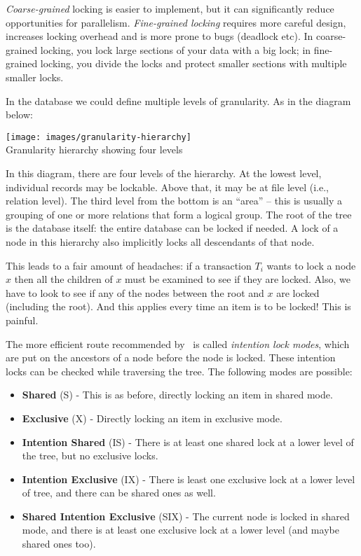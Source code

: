 \documentclass[a4paper]{report}
\begin{document}
\textit{Coarse-grained} locking is easier to implement, but it can significantly reduce opportunities for parallelism. \textit{Fine-grained locking} requires more careful design, increases locking overhead and is more prone to bugs (deadlock etc).  
In coarse-grained locking, you lock large sections of your data with a big lock; in fine-grained locking, you divide the locks and protect smaller sections with multiple smaller locks.

In the database we could define multiple levels of granularity. As in the diagram below:

\begin{center}
\texttt{[image: images/granularity-hierarchy]}\\
Granularity hierarchy showing four levels~\cite{dsc}
\end{center}

In this diagram, there are four levels of the hierarchy. At the lowest level, individual records may be lockable. Above that, it may be at file level (i.e., relation level). The third level from the bottom is an ``area'' -- this is usually a grouping of one or more relations that form a logical group. The root of the tree is the database itself: the entire database can be locked if needed. A lock of a node in this hierarchy also implicitly locks all descendants of that node.

This leads to a fair amount of headaches: if a transaction $T_{i}$ wants to lock a node $x$ then all the children of $x$ must be examined to see if they are locked. Also, we have to look to see if any of the nodes between the root and $x$ are locked (including the root). And this applies every time an item is to be locked! This is painful. 

The more efficient route recommended by~\cite{dsc} is called \textit{intention lock modes}, which are put on the ancestors of a node before the node is locked. These intention locks can be checked while traversing the tree. The following modes are possible:

\begin{itemize}
	\item \textbf{Shared} (S) - This is as before, directly locking an item in shared mode.
	\item \textbf{Exclusive} (X) - Directly locking an item in exclusive mode.
	\item \textbf{Intention Shared} (IS) - There is at least one shared lock at a lower level of the tree, but no exclusive locks.
	\item \textbf{Intention Exclusive} (IX) - There is least one exclusive lock at a lower level of tree, and there can be shared ones as well.
	\item \textbf{Shared Intention Exclusive} (SIX) - The current node is locked in shared mode, and there is at least one exclusive lock at a lower level (and maybe shared ones too).
\end{itemize} 
\end{document}
